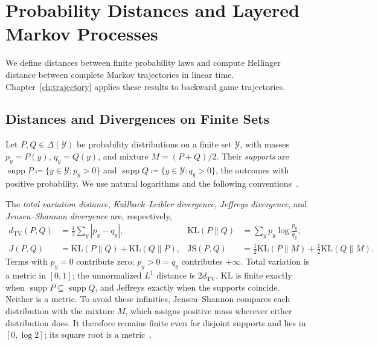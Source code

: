 \section{Probability Distances and Layered Markov Processes}\label{sec:probabilistic_foundations}\label{ptnb:app:path-divergence}

We define distances between finite probability laws and compute Hellinger distance between complete Markov trajectories in linear time. Chapter~\ref{ch:trajectory} applies these results to backward game trajectories.

\subsection{Distances and Divergences on Finite Sets}\label{sec:probability_distances}

Let $P,Q\in\Delta(\mathcal Y)$ be probability distributions on a finite set $\mathcal Y$, with masses $p_y=P(y)$, $q_y=Q(y)$, and mixture $M=(P+Q)/2$. Their \emph{supports} are $\operatorname{supp}P\coloneqq\{y\in\mathcal Y:p_y>0\}$ and $\operatorname{supp}Q\coloneqq\{y\in\mathcal Y:q_y>0\}$, the outcomes with positive probability. We use natural logarithms and the following conventions~\parencite[Chapter~7]{PolyanskiyWu2025InformationTheory}.
\begin{definition}\label{def:probability_divergences}
The \emph{total variation distance}, \emph{Kullback--Leibler divergence}, \emph{Jeffreys divergence}, and \emph{Jensen--Shannon divergence} are, respectively,
\begin{align*}
 d_{\mathrm{TV}}(P,Q)&=\tfrac12\sum_y|p_y-q_y|,
 &\mathrm{KL}(P\|Q)&=\sum_y p_y\log\frac{p_y}{q_y},\\
 J(P,Q)&=\mathrm{KL}(P\|Q)+\mathrm{KL}(Q\|P),
 &\mathrm{JS}(P,Q)&=\tfrac12\mathrm{KL}(P\|M)+\tfrac12\mathrm{KL}(Q\|M).
\end{align*}
Terms with $p_y=0$ contribute zero; $p_y>0=q_y$ contributes $+\infty$. Total variation is a metric in $[0,1]$; the unnormalized $L^1$ distance is $2d_{\mathrm{TV}}$. KL is finite exactly when $\operatorname{supp}P\subseteq\operatorname{supp}Q$, and Jeffreys exactly when the supports coincide. Neither is a metric. To avoid these infinities, Jensen--Shannon compares each distribution with the mixture $M$, which assigns positive mass wherever either distribution does. It therefore remains finite even for disjoint supports and lies in $[0,\log 2]$; its square root is a metric~\parencite{EndresSchindelin2003Metric}.
\end{definition}

